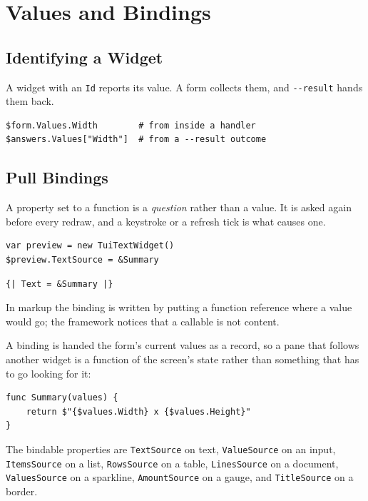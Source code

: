 \documentclass[11pt,a4paper,twoside,openany]{book}
\newcommand{\code}[1]{\texttt{\small #1}}
\begin{document}
\chapter{Values and Bindings}

\section{Identifying a Widget}

A widget with an \code{Id} reports its value. A form collects them, and
\code{-{}-result} hands them back.

\begin{lstlisting}
$form.Values.Width        # from inside a handler
$answers.Values["Width"]  # from a --result outcome
\end{lstlisting}

\section{Pull Bindings}

A property set to a function is a \emph{question} rather than a value. It is asked
again before every redraw, and a keystroke or a refresh tick is what causes one.

\begin{lstlisting}
var preview = new TuiTextWidget()
$preview.TextSource = &Summary
\end{lstlisting}

\begin{lstlisting}
{| Text = &Summary |}
\end{lstlisting}

In markup the binding is written by putting a function reference where a value
would go; the framework notices that a callable is not content.

A binding is handed the form's current values as a record, so a pane that follows
another widget is a function of the screen's state rather than something that has
to go looking for it:

\begin{lstlisting}
func Summary(values) {
    return $"{$values.Width} x {$values.Height}"
}
\end{lstlisting}

The bindable properties are \code{TextSource} on text, \code{ValueSource} on an
input, \code{ItemsSource} on a list, \code{RowsSource} on a table,
\code{LinesSource} on a document, \code{ValuesSource} on a sparkline,
\code{AmountSource} on a gauge, and \code{TitleSource} on a border.
\end{document}
